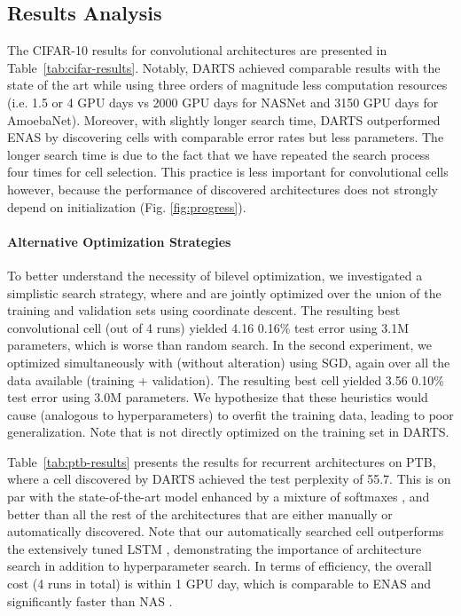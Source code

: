 \documentclass{article}
\begin{document}
\subsection{Results Analysis}
The CIFAR-10 results for convolutional architectures are presented in Table~\ref{tab:cifar-results}.
Notably,
DARTS achieved comparable results with the state of the art
\citep{zoph2017learning, real2018regularized}
while using three orders of magnitude less computation resources
(i.e. 1.5 or 4 GPU days vs 2000 GPU days for NASNet and 3150 GPU days for AmoebaNet).
Moreover,
with slightly longer search time,
DARTS outperformed ENAS \citep{pham2018efficient}
by discovering cells with comparable error rates but less parameters.
The longer search time is due to the fact that we have repeated the search process four times for cell selection.
This practice is less important for convolutional cells however,
because the performance of discovered architectures does not strongly depend on initialization (Fig. \ref{fig:progress}).

\paragraph{Alternative Optimization Strategies} To better understand the necessity of bilevel optimization,
we investigated a simplistic search strategy, where  and  are jointly optimized over the union of the training and validation sets using coordinate descent.
The resulting best convolutional cell (out of 4 runs) yielded 4.16  0.16\% test error using 3.1M parameters,
which is worse than random search.
In the second experiment, we optimized  simultaneously with  (without alteration) using SGD,
again over
all the data available (training + validation). The resulting best cell yielded 3.56  0.10\% test error using 3.0M parameters. 
We hypothesize that these heuristics would cause  (analogous to hyperparameters) to overfit the training data,
leading to poor generalization.
Note that  is not directly optimized on the training set in DARTS.

Table~\ref{tab:ptb-results} presents the results for recurrent architectures on PTB,
where a cell discovered by DARTS achieved the test perplexity of 55.7.
This is on par with the state-of-the-art model enhanced by a mixture of softmaxes \citep{yang2017breaking},
and better than all the rest of the  architectures that are either manually or automatically discovered.
Note that our automatically searched cell outperforms the extensively tuned LSTM \citep{melis2017state},
demonstrating the importance of architecture search in addition to hyperparameter search.
In terms of efficiency,
the overall cost (4 runs in total) is within 1 GPU day,
which is comparable to ENAS and significantly faster than NAS \citep{zoph2016neural}.
\end{document}
